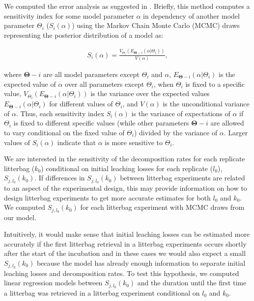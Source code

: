 \documentclass[bg, manuscript]{copernicus}
\begin{document}
We computed the error analysis as suggested in \citet{Eriksson.2019}. Briefly, this method computes a sensitivity index for some model parameter \(\alpha\) in dependency of another model parameter \(\Theta_i\) (\(S_i(\alpha)\)) using the Markov Chain Monte Carlo (MCMC) draws representing the posterior distribution of a model as:

\begin{equation}
\begin{aligned}
S_i(\alpha) = \frac{V_{\Theta_i}(E_{\bm{{\Theta}}-i}(\alpha|\Theta_i))}{V(\alpha)},
\label{eq:eriksson2019-1}
\end{aligned}
\end{equation}

where \(\bm{{\Theta}}-i\) are all model parameters except \(\Theta_i\) and \(\alpha\), \(E_{\bm{{\Theta}}-i}(\alpha|\Theta_i)\) is the expected value of \(\alpha\) over all parameters except \(\Theta_i\), when \(\Theta_i\) is fixed to a specific value, \(V_{\Theta_i}(E_{\bm{{\Theta}}-i}(\alpha|\Theta_i))\) is the variance over the expected values \(E_{\bm{{\Theta}}-i}(\alpha|\Theta_i)\) for different values of \(\Theta_i\), and \(V(\alpha)\) is the unconditional variance of \(\alpha\). Thus, each sensitivity index \(S_i(\alpha)\) is the variance of expectations of \(\alpha\) if \(\Theta_i\) is fixed to different specific values (while other parameters \(\bm{{\Theta}}-i\) are allowed to vary conditional on the fixed value of \(\Theta_i\)) divided by the variance of \(\alpha\). Larger values of \(S_i(\alpha)\) indicate that \(\alpha\) is more sensitive to \(\Theta_i\).

We are interested in the sensitivity of the decomposition rates for each replicate litterbag (\(k_0\)) conditional on initial leaching losses for each replicate (\(l_0\)), \(S_{j, l_0}(k_0)\). If differences in \(S_{j, l_0}(k_0)\) between litterbag experiments are related to an aspect of the experimental design, this may provide information on how to design litterbag experiments to get more accurate estimates for both \(l_0\) and \(k_0\). We computed \(S_{j, l_0}(k_0)\) for each litterbag experiment with MCMC draws from our model.

Intuitively, it would make sense that initial leaching losses can be estimated more accurately if the first litterbag retrieval in a litterbag experiments occurs shortly after the start of the incubation and in these cases we would also expect a small \(S_{j, l_0}(k_0)\) because the model has already enough information to separate initial leaching losses and decomposition rates. To test this hypothesis, we computed linear regression models between \(S_{j, l_0}(k_0)\) and the duration until the first time a litterbag was retrieved in a litterbag experiment conditional on \(l_0\) and \(k_0\).
\end{document}
